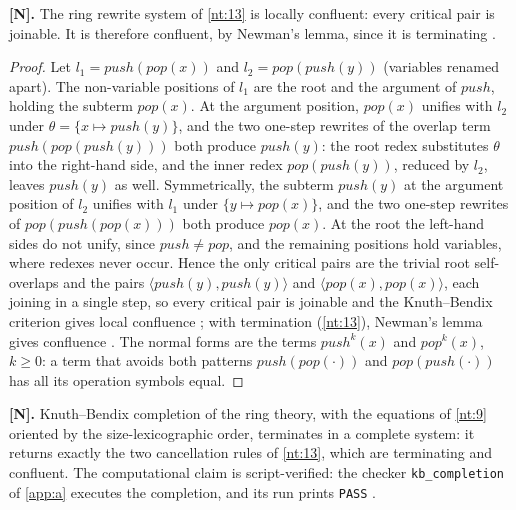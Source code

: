 \begin{theorem}\label{nt:14}
\textbf{[N].} The ring rewrite system of \autoref{nt:13} is locally
confluent: every critical pair is joinable. It is therefore confluent, by
Newman's lemma, since it is terminating \cite{newman}.
\end{theorem}

\begin{proof}
Let $l_1 = \mathit{push}(\mathit{pop}(x))$ and
$l_2 = \mathit{pop}(\mathit{push}(y))$ (variables renamed apart). The
non-variable positions of $l_1$ are the root and the argument of
$\mathit{push}$, holding the subterm $\mathit{pop}(x)$. At the argument
position, $\mathit{pop}(x)$ unifies with $l_2$ under
$\theta = \{x \mapsto \mathit{push}(y)\}$, and the two one-step rewrites of
the overlap term $\mathit{push}(\mathit{pop}(\mathit{push}(y)))$ both
produce $\mathit{push}(y)$: the root redex substitutes $\theta$ into the
right-hand side, and the inner redex $\mathit{pop}(\mathit{push}(y))$,
reduced by $l_2$, leaves $\mathit{push}(y)$ as well. Symmetrically, the
subterm $\mathit{push}(y)$ at the argument position of $l_2$ unifies with
$l_1$ under $\{y \mapsto \mathit{pop}(x)\}$, and the two one-step rewrites
of $\mathit{pop}(\mathit{push}(\mathit{pop}(x)))$ both produce
$\mathit{pop}(x)$. At the root the left-hand sides do not unify, since
$\mathit{push} \neq \mathit{pop}$, and the remaining positions hold
variables, where redexes never occur. Hence the only critical pairs are the
trivial root self-overlaps and the pairs
$\langle \mathit{push}(y), \mathit{push}(y) \rangle$ and
$\langle \mathit{pop}(x), \mathit{pop}(x) \rangle$, each joining in a
single step, so every critical pair is joinable and the Knuth--Bendix
criterion gives local confluence \cite{knuthbendix}; with termination
(\autoref{nt:13}), Newman's lemma gives confluence \cite{newman}. The
normal forms are the terms $\mathit{push}^{k}(x)$ and $\mathit{pop}^{k}(x)$,
$k \geq 0$: a term that avoids both patterns
$\mathit{push}(\mathit{pop}(\cdot))$ and
$\mathit{pop}(\mathit{push}(\cdot))$ has all its operation symbols equal.
\end{proof}

\begin{theorem}\label{nt:15}
\textbf{[N].} Knuth--Bendix completion of the ring theory, with the
equations of \autoref{nt:9} oriented by the size-lexicographic order,
terminates in a complete system: it returns exactly the two cancellation
rules of \autoref{nt:13}, which are terminating and confluent. The
computational claim is script-verified: the checker
\texttt{kb\_completion} of \autoref{app:a} executes the completion, and its
run prints \texttt{PASS} \cite{knuthbendix}.
\end{theorem}

